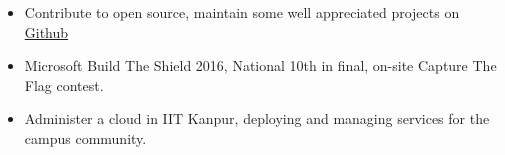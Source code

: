 
{\fontsize{11pt}{1em}\bodyfontlight\upshape\color{text}
\begin{itemize}
  \itemsep-0.3em
  \item Contribute to open source, maintain some well appreciated
    projects on \href{https://github.com/sakshamsharma}{Github}
  \item Microsoft Build The Shield 2016, National 10th in final,
    on-site Capture The Flag contest.
  \item Administer a cloud in IIT Kanpur, deploying and managing services for the campus community.
\end{itemize}
}

